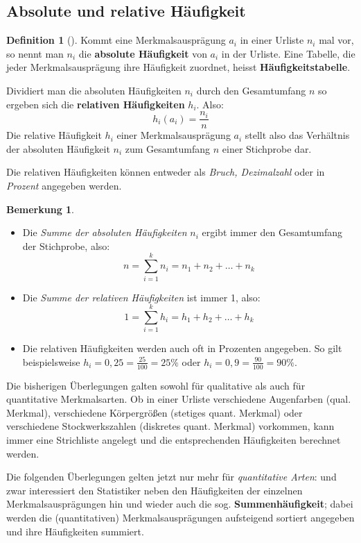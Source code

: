 \documentclass[a4paper, twoside, parskip, 10pt, smallheadings]{scrbook}
\theoremstyle{plain}
\theoremstyle{definition}
\newtheorem{Def}{Definition}%
\newtheorem*{Bem}{Bemerkung}
\newenvironment{fshaded}{%
\def\FrameCommand{\fcolorbox{framecolor}{shadecolor}}%
\MakeFramed {\FrameRestore}}%
{\endMakeFramed}
\newenvironment{fdef}[1][]{\definecolor{shadecolor}{rgb}{1,1,.29}%
\definecolor{framecolor}{rgb}{1,1,0}%
\begin{fshaded}\begin{Def}[#1]}{\end{Def}\end{fshaded}}
\newcommand{\bi}{\begin{itemize}}
\newcommand{\ei}{\end{itemize}}
\newcommand{\bd}{\begin{fdef}}
\newcommand{\ed}{\end{fdef}}
\begin{document}
\subsection{Absolute und relative H\"{a}ufigkeit}

\bd  Kommt eine
Merkmalsauspr\"{a}gung $a_i$  in einer Urliste $n_i$ mal vor, so
nennt man $n_i$ die {\bf absolute H\"{a}ufigkeit} von $a_i$ in der Urliste. Eine Tabelle, die jeder
Merkmalsauspr\"{a}gung ihre H\"{a}ufigkeit zuordnet, heisst {\bf H\"{a}ufigkeitstabelle}.

Dividiert man die absoluten H\"{a}ufigkeiten $n_i$ durch den Gesamtumfang $n$ so ergeben sich
die  {\bf relativen H\"{a}ufigkeiten} $h_i$. Also:
\[h_i(a_i)=\frac{n_i}{n}\]
Die relative H\"{a}ufigkeit $h_i$ einer Merkmalsauspr\"{a}gung $a_i$ stellt also das Verh\"{a}ltnis
der absoluten H\"{a}ufigkeit $n_i$ zum Gesamtumfang $n$ einer Stichprobe dar.

Die relativen H\"{a}ufigkeiten k\"{o}nnen entweder als {\it Bruch, \it Dezimalzahl} oder in {\it Prozent} angegeben
werden.
\ed  

\begin{Bem}
\bi \item  Die {\it Summe der absoluten H\"{a}ufigkeiten} $n_i$ ergibt immer den Gesamtumfang der Stichprobe, also:
\[n=\sum_{i=1}^k n_i = n_1 + n_2 + \dots + n_k\]

\item Die {\it Summe der relativen H\"{a}ufigkeiten} ist immer 1, also:
\[1=\sum_{i=1}^k h_i = h_1 + h_2 + \dots + h_k\]

\item Die relativen H\"{a}ufigkeiten werden auch oft in Prozenten angegeben. So gilt beispielsweise
$h_i=0,25=\frac{25}{100}=25\%$ oder $h_i=0,9=\frac{90}{100}=90\%$.
\ei
\end{Bem}



Die bisherigen \"{U}berlegungen galten sowohl f\"{u}r qualitative als auch f\"{u}r quantitative
Merkmalsarten. Ob in einer Urliste verschiedene Augenfarben (qual. Merkmal), verschiedene
K\"{o}rpergr\"{o}{\ss}en (stetiges quant. Merkmal) oder verschiedene Stockwerkszahlen (diskretes
quant. Merkmal) vorkommen, kann immer eine Strichliste angelegt und die entsprechenden
H\"{a}ufigkeiten berechnet werden.

Die folgenden \"{U}berlegungen gelten jetzt nur mehr f\"{u}r {\it quantitative Arten}: und zwar
interessiert den Statistiker neben den H\"{a}ufigkeiten der einzelnen Merkmalsauspr\"{a}gungen hin
und wieder auch die sog. {\bf Summenh\"{a}ufigkeit}; dabei werden die (quantitativen) Merkmalsausprägungen aufsteigend sortiert angegeben und ihre Häufigkeiten summiert. 
\end{document}
